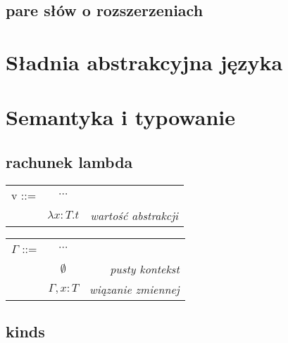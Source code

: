 \documentclass[11pt,leqno]{article}
\begin{document}
\subsection{pare słów o rozszerzeniach}


\section{Sładnia abstrakcyjna języka}
\setcounter{equation}{0}



\section{Semantyka i typowanie}                                 
\setcounter{equation}{0}


\subsection{rachunek lambda}



\begin{tabular}{ l c r }
  v ::= & $\cdots$ &  \\
   & $\lambda x:T.t$ & \textit{wartość abstrakcji} \\
\end{tabular}



\begin{tabular}{ l c r }
  $\Gamma$ ::= & $\cdots$ &  \\
   & $\emptyset$ & \textit{pusty kontekst} \\
   & $\Gamma,x:T$& \textit{wiązanie zmiennej} \\ 
\end{tabular}



\subsection{kinds}
\end{document}
